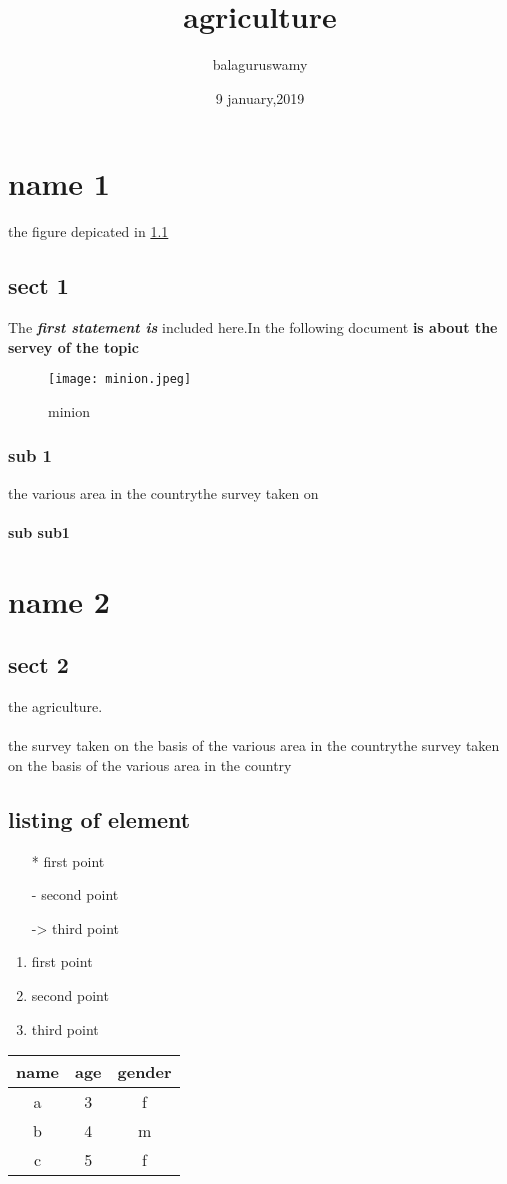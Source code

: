 \documentclass[12pt]{report} %
\begin{document}
\title{\textbf{agriculture}}
\author{balaguruswamy}
\date{9 january,2019}
\maketitle
\chapter{name 1}
the figure depicated in \ref{j}
\section*{sect 1}
	The \textbf{\textit{first statement is}} included here.In the following document\textbf{ is about the servey of the topic}
	\begin{figure}[h!]
		\centering
		\texttt{[image: minion.jpeg]}
		\caption{minion}
		\label{j}
	\end{figure}

\subsection{sub 1}the various area in the countrythe survey taken on

\subsubsection{sub sub1}
\chapter{name 2}
\section{sect 2}
 the agriculture.\\ \\the survey taken on the basis of the various area in the countrythe survey taken on the basis of the various area in the country
 \section{listing of element}
 \begin{itemize}
 	\item[*]  first point
 	\item[-]  second point
 	\item[->]  third point
 \end {itemize}
 	
 	
 \begin{enumerate}[label=\Alph*]
 	\item  first point
 \item  second point
 \item  third point
 \end{enumerate}

 \begin{center}
 \begin{tabular}{|c|c|c|}
 	\hline
 	name & age & gender\\
 	\hline
 	a & 3 & f \\
 	b & 4 & m \\
 	c & 5 & f \\
 	\hline
 \end{tabular}
\end{center}
 
\end{document}
